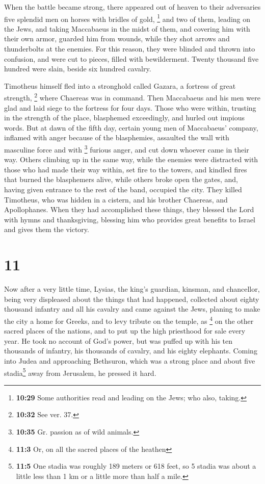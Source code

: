  When the battle became strong, there appeared out of
heaven to their adversaries five splendid men on horses with bridles of
gold, \footnote{\textbf{10:29} Some authorities read and leading on the
  Jews; who also, taking.} and two of them, leading on the Jews,
 and taking Maccabaeus in the midst of them, and covering
him with their own armor, guarded him from wounds, while they shot
arrows and thunderbolts at the enemies. For this reason, they were
blinded and thrown into confusion, and were cut to pieces, filled with
bewilderment.  Twenty thousand five hundred were slain,
beside six hundred cavalry.

 Timotheus himself fled into a stronghold called Gazara,
a fortress of great strength, \footnote{\textbf{10:32} See ver. 37.}
where Chaereas was in command.  Then Maccabaeus and his
men were glad and laid siege to the fortress for four days.
 Those who were within, trusting in the strength of the
place, blasphemed exceedingly, and hurled out impious words.
 But at dawn of the fifth day, certain young men of
Maccabaeus' company, inflamed with anger because of the blasphemies,
assaulted the wall with masculine force and with \footnote{\textbf{10:35}
  Gr. passion as of wild animals.} furious anger, and cut down whoever
came in their way.  Others climbing up in the same way,
while the enemies were distracted with those who had made their way
within, set fire to the towers, and kindled fires that burned the
blasphemers alive, while others broke open the gates, and, having given
entrance to the rest of the band, occupied the city. 
They killed Timotheus, who was hidden in a cistern, and his brother
Chaereas, and Apollophanes.  When they had accomplished
these things, they blessed the Lord with hymns and thanksgiving,
blessing him who provides great benefits to Israel and gives them the
victory.

\hypertarget{section-10}{%
\section{11}\label{section-10}}

 Now after a very little time, Lysias, the king's
guardian, kinsman, and chancellor, being very displeased about the
things that had happened,  collected about eighty thousand
infantry and all his cavalry and came against the Jews, planing to make
the city a home for Greeks,  and to levy tribute on the
temple, as \footnote{\textbf{11:3} Or, on all the sacred places of the
  heathen} on the other sacred places of the nations, and to put up the
high priesthood for sale every year.  He took no account
of God's power, but was puffed up with his ten thousands of infantry,
his thousands of cavalry, and his eighty elephants. 
Coming into Judea and approaching Bethsuron, which was a strong place
and about five stadia\footnote{\textbf{11:5} One stadia was roughly 189
  meters or 618 feet, so 5 stadia was about a little less than 1 km or a
  little more than half a mile.} away from Jerusalem, he pressed it
hard.

